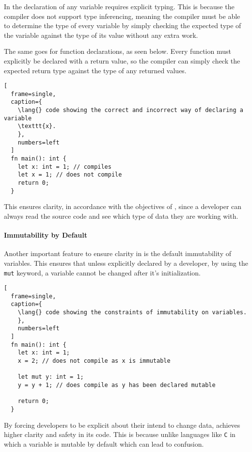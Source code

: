 In \lang{} the declaration of any variable requires explicit typing. This is because
the \lang{} compiler does not support type inferencing, meaning the compiler must be
able to determine the type of every variable by simply checking the expected type of
the variable against the type of its value without any extra work.

The same goes for function declarations, as seen below. Every function must
explicitly be declared with a return value, so the compiler can simply check the
expected return type against the type of any returned values. 

\begin{lstlisting}[
  frame=single,
  caption={
    \lang{} code showing the correct and incorrect way of declaring a variable
    \texttt{x}.
    }, 
    numbers=left
  ]
  fn main(): int {
    let x: int = 1; // compiles
    let x = 1; // does not compile
    return 0;
  }
\end{lstlisting}

This ensures clarity, in accordance with the objectives of \lang{}, since a
developer can always read the source code and see which type of data they are working
with.

\paragraph{Immutability by Default} \hfill 
\vspace{0.1em}

Another important feature to ensure clarity in \lang{} is the default immutability of
variables. This ensures that unless explicitly declared by a developer, by using the
\texttt{mut} keyword, a variable
cannot be changed after it's initialization.

\begin{lstlisting}[
  frame=single,
  caption={
    \lang{} code showing the constraints of immutability on variables.
    }, 
    numbers=left
  ]
  fn main(): int {
    let x: int = 1; 
    x = 2; // does not compile as x is immutable

    let mut y: int = 1; 
    y = y + 1; // does compile as y has been declared mutable

    return 0;
  }
\end{lstlisting}

By forcing developers to be explicit about their intend to change data, \lang{}
achieves higher clarity and safety in its code. This is because unlike languages like
\texttt{C} in which a variable is mutable by default which can lead to confusion. 


